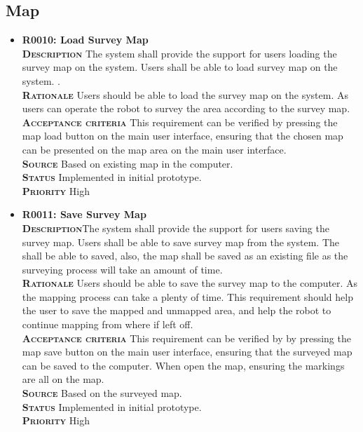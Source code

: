 \documentclass[11pt, a4paper]{article}
\begin{document}
\subsection{Map}
\begin{itemize}
\item {\bfseries R0010: Load Survey Map}\\
\textsc{\bfseries Description}  The system shall provide the support for users loading the survey map on the system. Users shall be able to load survey map on the system. .\\
\textsc{\bfseries Rationale} Users should be able to load the survey map on the system. As users can operate the robot to survey the area according to the survey map.\\
\textsc{\bfseries Acceptance criteria} This requirement can be verified by pressing the map load button on the main user interface, ensuring that the chosen map can be presented on the map area on the main user interface.\\
\textsc{\bfseries Source} Based on existing map in the computer.\\
\textsc{\bfseries Status} Implemented in initial prototype.\\
\textsc{\bfseries Priority} High\\

\item {\bfseries R0011: Save Survey Map}\\
\textsc{\bfseries Description}The system shall provide the support for users saving the survey map. Users shall be able to save survey map from the system. The shall be able to saved, also, the map shall be saved as an existing file as the surveying process will take an amount of time.\\
\textsc{\bfseries Rationale} Users should be able to save the survey map to the computer. As the mapping process can take a plenty of time. This requirement should help the user to save the mapped and unmapped area, and help the robot to continue mapping from where if left off.\\
\textsc{\bfseries Acceptance criteria} This requirement can be verified by by pressing the map save button on the main user interface, ensuring that the surveyed map can be saved to the computer. When open the map, ensuring the markings are all on the map.\\
\textsc{\bfseries Source} Based on the surveyed map.\\
\textsc{\bfseries Status} Implemented in initial prototype.\\
\textsc{\bfseries Priority} High\\


\end{itemize}
\end{document}
